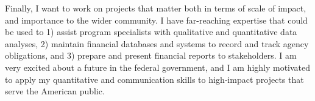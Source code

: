 \documentclass[11pt, a4paper]{maedbh-cv}
\begin{document}
\begin{cvletter}
	Finally, I want to work on projects that matter both in terms of scale of impact, and importance to the wider community. I have far-reaching expertise that could be used to 1) assist program specialists with qualitative and quantitative data analyses, 2) maintain financial databases and systems to record and track agency obligations, and 3) prepare and present financial reports to stakeholders. I am very excited about a future in the federal government, and I am highly motivated to apply my quantitative and communication skills to high‐impact projects that serve the American public. 

\end{cvletter}

\makeletterclosing
\end{document}
